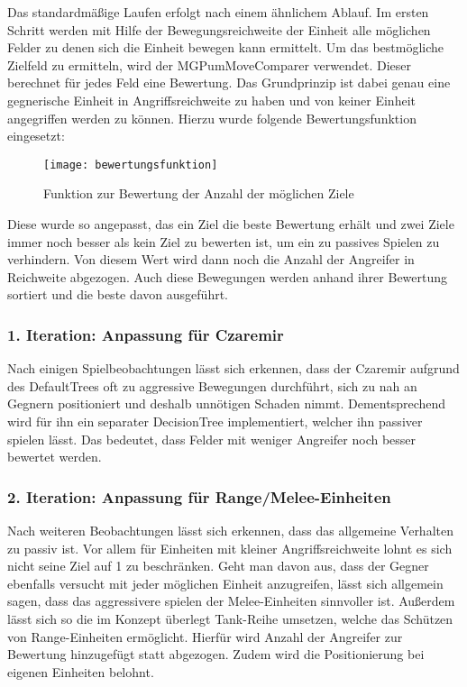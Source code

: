 Das standardmäßige Laufen erfolgt nach einem ähnlichem Ablauf. Im ersten Schritt werden mit Hilfe der Bewegungsreichweite der Einheit alle möglichen Felder zu denen sich die Einheit bewegen kann ermittelt. Um das bestmögliche Zielfeld zu ermitteln, wird der MGPumMoveComparer verwendet. Dieser berechnet für jedes Feld eine Bewertung. Das Grundprinzip ist dabei genau eine gegnerische Einheit in Angriffsreichweite zu haben und von keiner Einheit angegriffen werden zu können. Hierzu wurde folgende Bewertungsfunktion eingesetzt: 

\begin{figure}[H]
	\centering
	\texttt{[image: bewertungsfunktion]}
	\caption{Funktion zur Bewertung der Anzahl der möglichen Ziele}
	\label{fig:bewertungsfunktion}
\end{figure}

Diese wurde so angepasst, das ein Ziel die beste Bewertung erhält und zwei Ziele immer noch besser als kein Ziel zu bewerten ist, um ein zu passives Spielen zu verhindern. Von diesem Wert wird dann noch die Anzahl der Angreifer in Reichweite abgezogen. Auch diese Bewegungen werden anhand ihrer Bewertung sortiert und die beste davon ausgeführt.

\subsubsection{1. Iteration: Anpassung für Czaremir}

Nach einigen Spielbeobachtungen lässt sich erkennen, dass der Czaremir aufgrund des DefaultTrees oft zu aggressive Bewegungen durchführt, sich zu nah an Gegnern positioniert und deshalb unnötigen Schaden nimmt. Dementsprechend wird für ihn ein separater DecisionTree implementiert, welcher ihn passiver spielen lässt. Das bedeutet, dass Felder mit weniger Angreifer noch besser bewertet werden.

\subsubsection{2. Iteration: Anpassung für Range/Melee-Einheiten}

Nach weiteren Beobachtungen lässt sich erkennen, dass das allgemeine Verhalten zu passiv ist. Vor allem für Einheiten mit kleiner Angriffsreichweite lohnt es sich nicht seine Ziel auf 1 zu beschränken. Geht man davon aus, dass der Gegner ebenfalls versucht mit jeder möglichen Einheit anzugreifen, lässt sich allgemein sagen, dass das aggressivere spielen der Melee-Einheiten sinnvoller ist. Außerdem lässt sich so die im Konzept überlegt Tank-Reihe umsetzen, welche das Schützen von Range-Einheiten ermöglicht. Hierfür wird Anzahl der Angreifer zur Bewertung hinzugefügt statt abgezogen. Zudem wird die Positionierung bei eigenen Einheiten belohnt.

